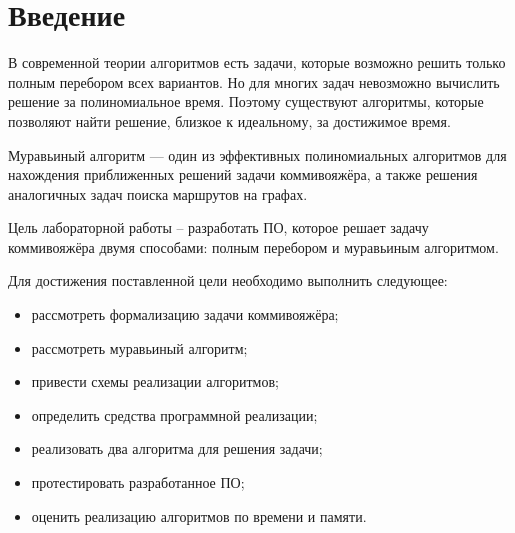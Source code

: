 \newpage
{}

\chapter*{Введение}
В современной теории алгоритмов есть задачи, которые возможно решить только полным перебором всех вариантов.
Но для многих задач невозможно вычислить решение за полиномиальное время.
Поэтому существуют алгоритмы, которые позволяют найти решение, близкое к идеальному, за достижимое время.

Муравьиный алгоритм — один из эффективных полиномиальных алгоритмов для нахождения приближенных решений задачи коммивояжёра, 
а также решения аналогичных задач поиска маршрутов на графах.

Цель лабораторной работы -- разработать ПО, которое решает задачу коммивояжёра двумя способами: полным перебором и муравьиным алгоритмом.

Для достижения поставленной цели необходимо выполнить следующее:
\begin{itemize}
	\item рассмотреть формализацию задачи коммивояжёра;
	\item рассмотреть муравьиный алгоритм;
	\item привести схемы реализации алгоритмов;
	\item определить средства программной реализации;
	\item реализовать два алгоритма для решения задачи;
	\item протестировать разработанное ПО;
	\item оценить реализацию алгоритмов по времени и памяти.
\end{itemize}